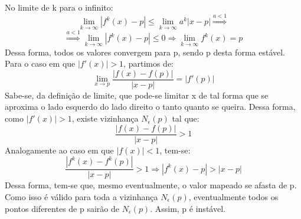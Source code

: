 \documentclass{article}[twocolumn]
\begin{document}
	No limite de k para o infinito:
	\begin{equation}
		\lim_{k \rightarrow \infty}|f^{k}(x) - p| \leqslant \lim_{k \rightarrow \infty}a^{k}|x - p|
		\stackrel{a < 1}{\Rightarrow}
	\end{equation}
	\begin{equation}
		\stackrel{a < 1}{\Rightarrow}
		\lim_{k \rightarrow \infty}|f^{k}(x) - p| \leqslant 0
		\Rightarrow \lim_{k \rightarrow \infty}f^{k}(x) = p
	\end{equation}
	Dessa forma, todos os valores convergem para p, sendo p desta forma estável.\\
	Para o caso em que $|f'(x)| > 1$, partimos de:
	\begin{equation}
		\lim_{x \rightarrow p} \frac{|f(x) - f(p)|}{|x - p|} = |f'(p)|
	\end{equation}
	Sabe-se, da definição de limite, que pode-se limitar x de tal forma que se aproxima o lado
	esquerdo do lado direito o tanto quanto se queira. Dessa forma, como $|f'(x)| > 1$, existe
	vizinhança $N_{\epsilon}(p)$ tal que:
	\begin{equation}
		\frac{|f(x) - f(p)|}{|x - p|} > 1
	\end{equation}
	Analogamente ao caso em que $|f(x)| < 1$, tem-se:
	\begin{equation}
		\frac{|f^{k}(x) - f^{k}(p)|}{|x - p|} > 1 \Rightarrow
		|f^{k}(x) - p| > |x - p|
	\end{equation}
	Dessa forma, tem-se que, mesmo eventualmente, o valor mapeado se afasta de p. Como isso é válido
	para toda a vizinhança $N_{\epsilon}(p)$, eventualmente todos os pontos diferentes de p
	sairão de $N_{\epsilon}(p)$. Assim, p é instável.
\end{document}
